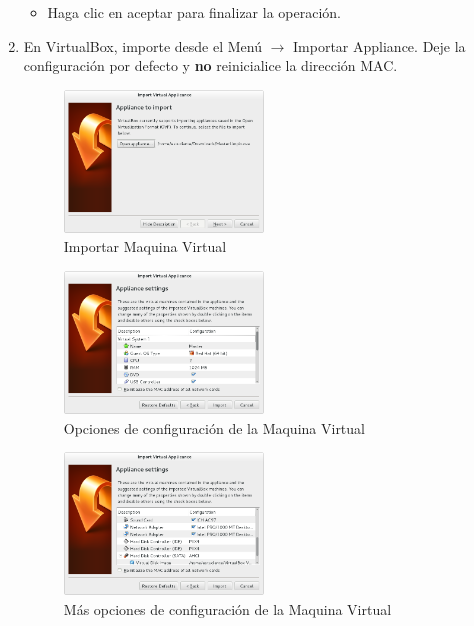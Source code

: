 \begin{enumerate}
\begin{itemize}
	\item Haga clic en aceptar para finalizar la operación.

\end{itemize}

\item En VirtualBox, importe desde el Menú $\rightarrow$ Importar Appliance. Deje la configuración por defecto y \textbf{no} reinicialice la dirección MAC.



\begin{figure}[H]
	\centering
	\includegraphics[width=0.5\textwidth]{aux/importappliance}
	\caption{Importar Maquina Virtual}
\end{figure}


\begin{figure}[H]
	\centering
	\includegraphics[width=0.5\textwidth]{aux/applianceops1}
	\caption{Opciones de configuración de la Maquina Virtual}
\end{figure}


\begin{figure}[H]
	\centering
	\includegraphics[width=0.5\textwidth]{aux/applianceops2}
	\caption{Más opciones de configuración de la Maquina Virtual}
\end{figure}




\end{enumerate}

